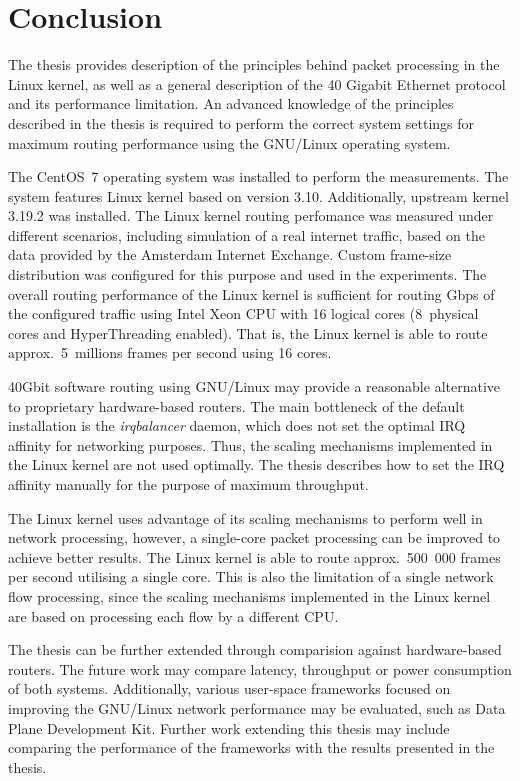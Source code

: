 
\chapter{Conclusion}\label{chap:conclusion}
The thesis provides description of the principles behind packet processing in the Linux kernel, as well as
a general description of the 40 Gigabit Ethernet protocol and its performance limitation.
An advanced knowledge of the principles described in the thesis is required to
perform the correct system settings for maximum routing performance using the GNU/Linux operating system.

The CentOS~7 operating system was installed to perform the measurements.
The system features Linux kernel based on version 3.10.
Additionally, upstream kernel 3.19.2 was installed.
The Linux kernel routing perfomance was measured under different scenarios, including
simulation of a real internet traffic, based on the data provided by the Amsterdam Internet Exchange.
Custom frame-size distribution was configured for this purpose and used in the experiments.
The overall routing performance of the Linux kernel is sufficient for routing %
Gbps of the configured traffic using Intel Xeon CPU with 16 logical cores (8~physical cores and HyperThreading enabled).
That is, the Linux kernel is able to route approx.~5~millions frames per second using 16 cores.

40Gbit software routing using GNU/Linux may provide a reasonable alternative to proprietary hardware-based routers.
The main bottleneck of the default installation is the {\it{irqbalancer}} daemon, which
does not set the optimal IRQ affinity for networking purposes.
Thus, the scaling mechanisms implemented in the Linux kernel are not used optimally.
The thesis describes how to set the IRQ affinity manually for the purpose of maximum throughput.

The Linux kernel uses advantage of its scaling mechanisms to perform well in network processing,
however, a single-core packet processing can be improved to achieve better results.
The Linux kernel is able to route approx.~500~000 %
frames per second utilising a single core.
This is also the limitation of a single network flow processing,
since the scaling mechanisms implemented in the Linux kernel are based on processing each flow by a different CPU.

The thesis can be further extended through comparision against hardware-based routers.
The future work may compare latency, throughput or power consumption of both systems.
Additionally, various user-space frameworks focused on improving the GNU/Linux network performance may be evaluated,
such as Data Plane Development Kit.
Further work extending this thesis may include comparing the performance of
the frameworks with the results presented in the thesis.


